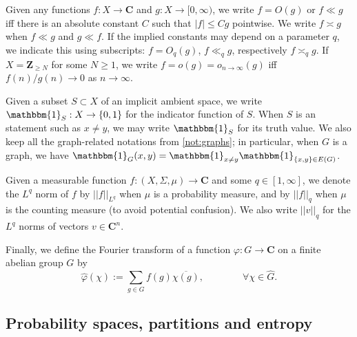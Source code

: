 \documentclass[reqno,11pt]{amsart}
\theoremstyle{definition}
\theoremstyle{remark}
\numberwithin{equation}{section}
\newcommand{\Z}{\mathbf{Z}}
\newcommand{\C}{\mathbf{C}}
\newcommand{\one}{\mathbbm{1}}
\renewcommand{\bar}{\overline}
\renewcommand{\hat}{\widehat}
\begin{document}
Given any functions $f : X \to \C$ and $g : X \to [0, \infty)$, we write $f = O(g)$ or $f \ll g$ iff there is an absolute constant $C$ such that $|f| \le Cg$ pointwise. We write $f \asymp g$ when $f \ll g$ and $g \ll f$. If the implied constants may depend on a parameter $q$, we indicate this using subscripts: $f = O_q(g)$, $f \ll_q g$, respectively $f \asymp_q g$. If $X = \Z_{\ge N}$ for some $N \ge 1$, we write $f = o(g) = o_{n \to \infty}(g)$ iff $f(n)/g(n) \to 0$ as $n \to \infty$. %

Given a subset $S \subset X$ of an implicit ambient space, we write $\one_S : X \to \{0, 1\}$ for the indicator function of $S$. When $S$ is an statement such as $x \neq y$, we may write $\one_S$ for its truth value. We also keep all the graph-related notations from \cref{not:graphs}; in particular, when $G$ is a graph, we have $\one_G(x, y) = \one_{x \neq y} \one_{\{x,y\} \in E(G)}$. 

Given a measurable function $f : (X, \Sigma, \mu) \to \C$ and some $q \in [1, \infty]$, we denote the $L^q$ norm of $f$ by $||f||_{L^q}$ when $\mu$ is a probability measure, and by $||f||_q$ when $\mu$ is the counting measure (to avoid potential confusion). We also write $||v||_q$ for the $L^q$ norms of vectors $v \in \C^n$.

Finally, we define the Fourier transform of a function $\varphi : G \to \C$ on a finite abelian group $G$ by
\begin{equation} \label{eq:Fourier}
    \hat{\varphi}(\chi) := \sum_{g \in G} f(g) \bar{\chi(g)},
    \qquad\qquad 
    \forall \chi \in \hat{G}.
\end{equation}


\subsection{Probability spaces, partitions and entropy} \label{subsec:partitions}
\end{document}
